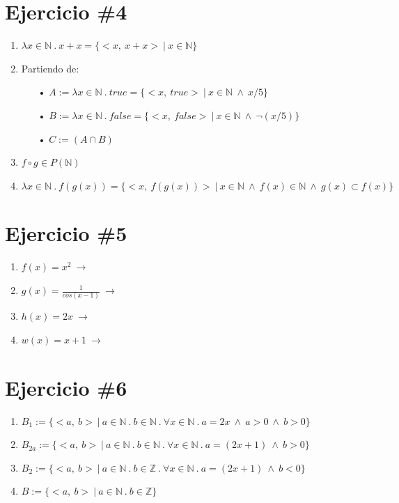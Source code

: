 \documentclass[11pt,letterpaper]{article}
\begin{document}
\section{Ejercicio \#4}
\begin{enumerate}
\item $\lambda x \in \mathbb{N}\ .\ x+x=\{<x,\ x+x>\ |\ x \in \mathbb{N}\}$

\item Partiendo de:
\begin{itemize}
\item[•] $A:=\lambda x \in \mathbb{N}\ .\ true = \{<x,\ true>\ |\ x \in \mathbb{N}\ \wedge\ x/5\}$
\item[•] $B:=\lambda x \in \mathbb{N}\ .\ false = \{<x,\ false>\ |\ x \in \mathbb{N}\ \wedge\ \neg (x/5)\}$\\
\item[•] $C:=(A \cap B)$
\end{itemize}

\item $f \circ g \in P(\mathbb{N})$

\item $\lambda x \in \mathbb{N}\ .\ f(g(x)) = \{<x,\ f(g(x))>\ |\ x \in \mathbb{N}\ \wedge\ f(x) \in \mathbb{N}\ \wedge\ g(x) \subset f(x)\}$
\end{enumerate}


\section{Ejercicio \#5}

\begin{enumerate}
\item $f(x)=x^2 \ \rightarrow \ \ $
\item $g(x)=\frac{1}{cos(x-1)} \ \rightarrow \ \ $
\item $h(x)=2x \ \rightarrow \ \ $
\item $w(x)=x+1 \ \rightarrow \ \ $
\end{enumerate}


\section{Ejercicio \#6}
\begin{enumerate}
\item $B_1 := \{<a,\ b>\ |\ a \in \mathbb{N}\ .\ b \in \mathbb{N}\ .\ \forall x \in \mathbb{N}\ .\ a=2x\ \wedge\ a>0\ \wedge\ b>0\}$
\item $B_{2a} := \{<a,\ b>\ |\ a \in \mathbb{N}\ .\ b \in \mathbb{N}\ .\ \forall x \in \mathbb{N}\ .\ a=(2x+1)\ \wedge\ b>0\}$
\item $B_2 := \{<a,\ b>\ |\ a \in \mathbb{N}\ .\ b \in \mathbb{Z}\ .\ \forall x \in \mathbb{N}\ .\ a=(2x+1)\ \wedge\ b<0\}$
\item $B := \{<a,\ b>\ |\ a \in \mathbb{N}\ .\ b \in \mathbb{Z}\}$
\end{enumerate}
\end{document}
